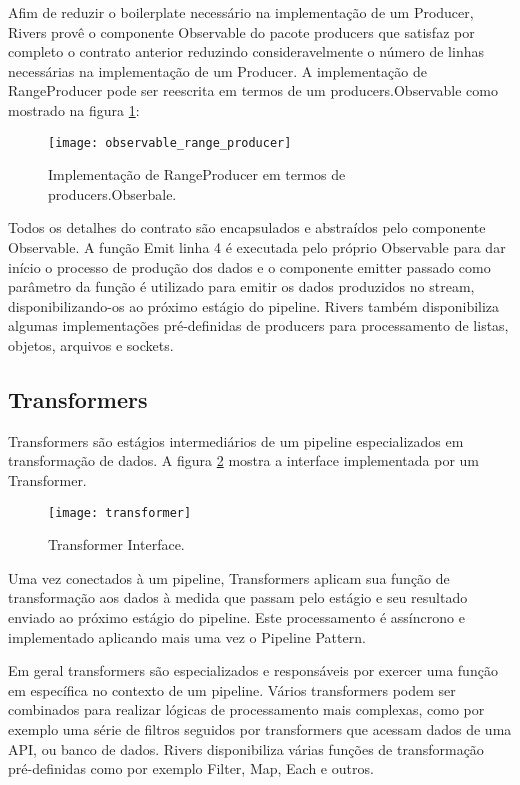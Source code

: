 Afim de reduzir o boilerplate necessário na implementação de um Producer, Rivers provê o componente Observable do pacote producers que satisfaz por completo o contrato anterior reduzindo consideravelmente o número de linhas necessárias na implementação de um Producer. A implementação de RangeProducer pode ser reescrita em termos de um producers.Observable como mostrado na figura \ref{code:rivers:observable_range_producer}:

\begin{figure}[H]
  \texttt{[image: observable\_range\_producer]}
  \centering
  \caption{Implementação de RangeProducer em termos de producers.Obserbale.}
  \label{code:rivers:observable_range_producer}
\end{figure}

Todos os detalhes do contrato são encapsulados e abstraídos pelo componente Observable. A função Emit linha 4 é executada pelo próprio Observable para dar início o processo de produção dos dados e o componente emitter passado como parâmetro da função é utilizado para emitir os dados produzidos no stream, disponibilizando-os ao próximo estágio do pipeline. Rivers também disponibiliza algumas implementações pré-definidas de producers para processamento de listas, objetos, arquivos e sockets.

\subsection{Transformers}
\label{sec:rivers:transformers}

Transformers são estágios intermediários de um pipeline especializados em transformação de dados. A figura \ref{code:rivers:transformer} mostra a interface implementada por um Transformer.

\begin{figure}[H]
  \texttt{[image: transformer]}
  \centering
  \caption{Transformer Interface.}
  \label{code:rivers:transformer}
\end{figure}

Uma vez conectados à um pipeline, Transformers aplicam sua função de transformação aos dados à medida que passam pelo estágio e seu resultado enviado ao próximo estágio do pipeline. Este processamento é assíncrono e implementado aplicando mais uma vez o Pipeline Pattern.

Em geral transformers são especializados e responsáveis por exercer uma função em específica no contexto de um pipeline. Vários transformers podem ser combinados para realizar lógicas de processamento mais complexas, como por exemplo uma série de filtros seguidos por transformers que acessam dados de uma API, ou banco de dados. Rivers disponibiliza várias funções de transformação pré-definidas como por exemplo Filter, Map, Each e outros.

